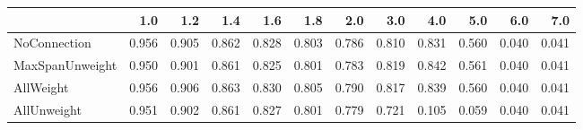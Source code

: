 \begin{tabular}{lrrrrrrrrrrr}
\toprule
{} &   1.0 &   1.2 &   1.4 &   1.6 &   1.8 &   2.0 &   3.0 &   4.0 &   5.0 &   6.0 &   7.0 \\
\midrule
NoConnection    & 0.956 & 0.905 & 0.862 & 0.828 & 0.803 & 0.786 & 0.810 & 0.831 & 0.560 & 0.040 & 0.041 \\
MaxSpanUnweight & 0.950 & 0.901 & 0.861 & 0.825 & 0.801 & 0.783 & 0.819 & 0.842 & 0.561 & 0.040 & 0.041 \\
AllWeight       & 0.956 & 0.906 & 0.863 & 0.830 & 0.805 & 0.790 & 0.817 & 0.839 & 0.560 & 0.040 & 0.041 \\
AllUnweight     & 0.951 & 0.902 & 0.861 & 0.827 & 0.801 & 0.779 & 0.721 & 0.105 & 0.059 & 0.040 & 0.041 \\
\bottomrule
\end{tabular}
